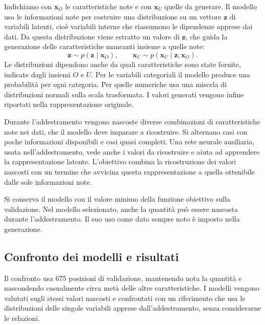 Indichiamo con $\bm{x}_O$ le caratteristiche note e con $\bm{x}_U$ quelle da generare. Il modello usa le informazioni note per costruire una distribuzione su un vettore $\bm{z}$ di variabili latenti, cioè variabili interne che riassumono le dipendenze apprese dai dati. Da questa distribuzione viene estratto un valore di $\bm{z}$, che guida la generazione delle caratteristiche mancanti insieme a quelle note:
\begin{equation}
\label{eq:vaeac-generation}
\bm{z}\sim p(\bm{z}\mid\bm{x}_O),
\qquad
\bm{x}_U\sim p(\bm{x}_U\mid\bm{z},\bm{x}_O).
\end{equation}
Le distribuzioni dipendono anche da quali caratteristiche sono state fornite, indicate dagli insiemi $O$ e $U$. Per le variabili categoriali il modello produce una probabilità per ogni categoria. Per quelle numeriche usa una miscela di distribuzioni normali sulla scala trasformata. I valori generati vengono infine riportati nella rappresentazione originale.

Durante l'addestramento vengono nascoste diverse combinazioni di caratteristiche note nei dati, che il modello deve imparare a ricostruire. Si alternano casi con poche informazioni disponibili e casi quasi completi. Una rete neurale ausiliaria, usata nell'addestramento, vede anche i valori da ricostruire e aiuta ad apprendere la rappresentazione latente. L'obiettivo combina la ricostruzione dei valori nascosti con un termine che avvicina questa rappresentazione a quella ottenibile dalle sole informazioni note.

Si conserva il modello con il valore minimo della funzione obiettivo sulla validazione. Nel modello selezionato, anche la quantità può essere nascosta durante l'addestramento. Il suo uso come dato sempre noto è imposto nella generazione.

\subsection{Confronto dei modelli e risultati}
\label{sec:feature-generation-results}

Il confronto usa 675 posizioni di validazione, mantenendo nota la quantità e nascondendo casualmente circa metà delle altre caratteristiche. I modelli vengono valutati sugli stessi valori nascosti e confrontati con un riferimento che usa le distribuzioni delle singole variabili apprese dall'addestramento, senza considerarne le relazioni.

